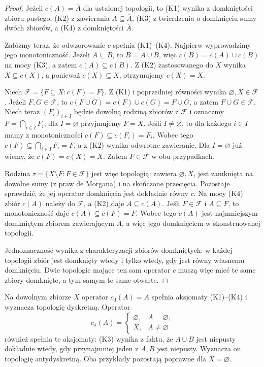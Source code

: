 \begin{proof}
Jeżeli $c(A)=\overline A$ dla ustalonej topologii,
to (K1) wynika z domkniętości zbioru pustego,
(K2) z zawierania $A\subseteq\overline A$,
(K3) z twierdzenia o domknięciu sumy dwóch zbiorów,
a (K4) z domkniętości $\overline A$.

Załóżmy teraz, że odwzorowanie $c$ spełnia (K1)--(K4).
Najpierw wyprowadzimy jego monotoniczność.
Jeżeli $A\subseteq B$, to $B=A\cup B$, więc
$c(B)=c(A)\cup c(B)$ na mocy (K3), a zatem
$c(A)\subseteq c(B)$.
Z (K2) zastosowanego do $X$ wynika $X\subseteq c(X)$,
a ponieważ $c(X)\subseteq X$, otrzymujemy $c(X)=X$.

Niech $\mathcal F=\{F\subseteq X:c(F)=F\}$.
Z (K1) i poprzedniej równości wynika
$\varnothing,X\in\mathcal F$.
Jeżeli $F,G\in\mathcal F$, to
$c(F\cup G)=c(F)\cup c(G)=F\cup G$,
a zatem $F\cup G\in\mathcal F$.
Niech teraz $(F_i)_{i\in I}$ będzie dowolną rodziną
zbiorów z $\mathcal F$ i oznaczmy
$F=\bigcap_{i\in I}F_i$; dla $I=\varnothing$ przyjmujemy $F=X$.
Jeśli $I\ne\varnothing$, to dla każdego $i\in I$
mamy z monotoniczności
$c(F)\subseteq c(F_i)=F_i$.
Wobec tego $c(F)\subseteq\bigcap_{i\in I}F_i=F$,
a z (K2) wynika odwrotne zawieranie.
Dla $I=\varnothing$ już wiemy, że $c(F)=c(X)=X$.
Zatem $F\in\mathcal F$ w obu przypadkach.

Rodzina $\tau=\{X\setminus F:F\in\mathcal F\}$
jest więc topologią: zawiera $\varnothing,X$,
jest zamknięta na dowolne sumy (z praw de Morgana)
i na skończone przecięcia.
Pozostaje sprawdzić, że jej operator domknięcia
jest dokładnie równy $c$.
Na mocy (K4) zbiór $c(A)$ należy do $\mathcal F$,
a (K2) daje $A\subseteq c(A)$. Jeśli $F\in\mathcal F$
i $A\subseteq F$, to monotoniczność daje
$c(A)\subseteq c(F)=F$.
Wobec tego $c(A)$ jest najmniejszym domkniętym
zbiorem zawierającym $A$, a więc jego domknięciem
w skonstruowanej topologii.

Jednoznaczność wynika z charakteryzacji zbiorów domkniętych:
w każdej topologii zbiór jest domknięty wtedy
i tylko wtedy, gdy jest równy własnemu domknięciu.
Dwie topologie mające ten sam operator $c$ muszą więc
mieć te same zbiory domknięte, a tym samym te same otwarte.
\end{proof}

\begin{przyklad}
\label{ex:topog-operatory-skr}
Na dowolnym zbiorze $X$ operator $c_{\mathrm d}(A)=A$
spełnia aksjomaty (K1)--(K4) i wyznacza topologię dyskretną.
Operator
\[
c_{\mathrm a}(A)=
\begin{cases}
\varnothing,&A=\varnothing,\\
X,&A\ne\varnothing
\end{cases}
\]
również spełnia te aksjomaty: (K3) wynika z faktu,
że $A\cup B$ jest niepusty dokładnie wtedy,
gdy przynajmniej jeden z $A,B$ jest niepusty.
Wyznacza on topologię antydyskretną.
Oba przykłady pozostają poprawne dla $X=\varnothing$.
\end{przyklad}

